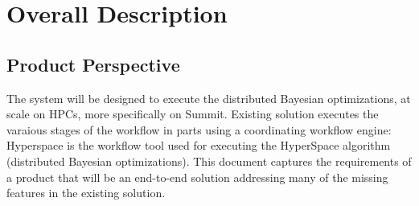 \documentclass{scrreprt}
\begin{document}



\chapter{Overall Description}

\section{Product Perspective}

The system will be designed to execute the distributed Bayesian optimizations, 
at scale on HPCs, more specifically on Summit. Existing solution executes the varaious stages of the workflow in parts using a coordinating workflow engine: Hyperspace is the workflow tool used for executing the HyperSpace algorithm (distributed Bayesian optimizations). This document captures the requirements of a product that will be an end-to-end solution addressing many of the missing features in the existing solution. 

\end{document}
